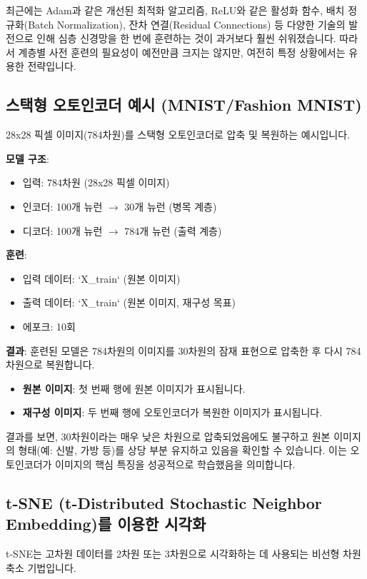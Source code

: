 \documentclass[11pt,a4paper]{article}
\begin{document}
\begin{warningbox}[최근의 변화]
최근에는 Adam과 같은 개선된 최적화 알고리즘, ReLU와 같은 활성화 함수, 배치 정규화(Batch Normalization), 잔차 연결(Residual Connections) 등 다양한 기술의 발전으로 인해 심층 신경망을 한 번에 훈련하는 것이 과거보다 훨씬 쉬워졌습니다. 따라서 계층별 사전 훈련의 필요성이 예전만큼 크지는 않지만, 여전히 특정 상황에서는 유용한 전략입니다.
\end{warningbox}

\subsection{스택형 오토인코더 예시 (MNIST/Fashion MNIST)}
28x28 픽셀 이미지(784차원)를 스택형 오토인코더로 압축 및 복원하는 예시입니다.

\begin{examplebox}
\textbf{모델 구조}:
\begin{itemize}
    \item 입력: 784차원 (28x28 픽셀 이미지)
    \item 인코더: 100개 뉴런 $\rightarrow$ 30개 뉴런 (병목 계층)
    \item 디코더: 100개 뉴런 $\rightarrow$ 784개 뉴런 (출력 계층)
\end{itemize}

\textbf{훈련}:
\begin{itemize}
    \item 입력 데이터: `X_train` (원본 이미지)
    \item 출력 데이터: `X_train` (원본 이미지, 재구성 목표)
    \item 에포크: 10회
\end{itemize}

\textbf{결과}:
훈련된 모델은 784차원의 이미지를 30차원의 잠재 표현으로 압축한 후 다시 784차원으로 복원합니다.
\begin{itemize}
    \item \textbf{원본 이미지}: 첫 번째 행에 원본 이미지가 표시됩니다.
    \item \textbf{재구성 이미지}: 두 번째 행에 오토인코더가 복원한 이미지가 표시됩니다.
\end{itemize}
결과를 보면, 30차원이라는 매우 낮은 차원으로 압축되었음에도 불구하고 원본 이미지의 형태(예: 신발, 가방 등)를 상당 부분 유지하고 있음을 확인할 수 있습니다. 이는 오토인코더가 이미지의 핵심 특징을 성공적으로 학습했음을 의미합니다.
\end{examplebox}

\newpage
\subsection{t-SNE (t-Distributed Stochastic Neighbor Embedding)를 이용한 시각화}
t-SNE는 고차원 데이터를 2차원 또는 3차원으로 시각화하는 데 사용되는 비선형 차원 축소 기법입니다.
\end{document}
